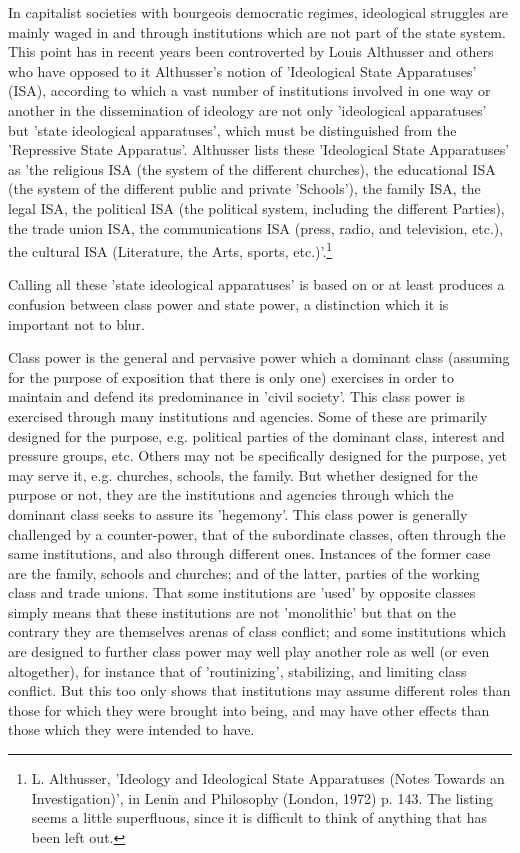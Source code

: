 In capitalist societies with bourgeois democratic regimes, ideological struggles are mainly waged in and through institutions which are not part of the state system. This point has in recent years been controverted by Louis Althusser and others who have opposed to it Althusser's notion of 'Ideological State Apparatuses' (ISA), according to which a vast number of institutions involved in one way or another in the dissemination of ideology are not only 'ideological apparatuses' but 'state ideological apparatuses', which must be distinguished from the 'Repressive State Apparatus'. Althusser lists these 'Ideological State Apparatuses' as 'the religious ISA (the system of the different churches), the educational ISA (the system of the different public and private 'Schools'), the family ISA, the legal ISA, the political ISA (the political system, including the different Parties), the trade union ISA, the communications ISA (press, radio, and television, etc.), the cultural ISA (Literature, the Arts, sports, etc.)'.\footnote{L. Althusser, 'Ideology and Ideological State Apparatuses (Notes Towards an Investigation)', in Lenin and Philosophy (London, 1972) p. 143. The listing seems a little superfluous, since it is difficult to think of anything that has been left out.}

Calling all these 'state ideological apparatuses' is based on or at least produces a confusion between class power and state power, a distinction which it is important not to blur.

Class power is the general and pervasive power which a dominant class (assuming for the purpose of exposition that there is only one) exercises in order to maintain and defend its predominance in 'civil society'. This class power is exercised through many institutions and agencies. Some of these are primarily designed for the purpose, e.g. political parties of the dominant class, interest and pressure groups, etc. Others may not be specifically designed for the purpose, yet may serve it, e.g. churches, schools, the family. But whether designed for the purpose or not, they are the institutions and agencies through which the dominant class seeks to assure its 'hegemony'. This class power is generally challenged by a counter-power, that of the subordinate classes, often through the same institutions, and also through different ones. Instances of the former case are the family, schools and churches; and of the latter, parties of the working class and trade unions. That some institutions are 'used' by opposite classes simply means that these institutions are not 'monolithic' but that on the contrary they are themselves arenas of class conflict; and some institutions which are designed to further class power may well play another role as well (or even altogether), for instance that of 'routinizing', stabilizing, and limiting class conflict. But this too only shows that institutions may assume different roles than those for which they were brought into being, and may have other effects than those which they were intended to have.

